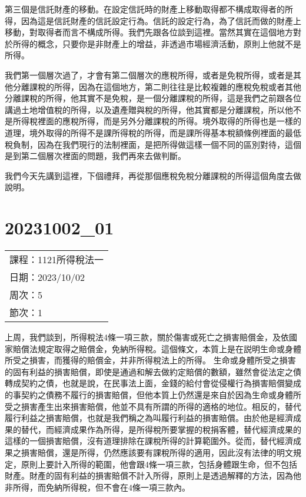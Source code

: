 \documentclass[]{ctexbook}
\begin{document}
第三個是信託財產的移動。在設定信託時的財產上移動取得都不構成取得者的所得，因為這是信託財產的信託設定行為。信託的設定行為，為了信託而做的財產上移動，對取得者而言不構成所得。我們先跟各位談到這裡。當然其實在這個地方對於所得的概念，只要你是非財產上的增益，非透過市場經濟活動，原則上他就不是所得。

我們第一個層次過了，才會有第二個層次的應稅所得，或者是免稅所得，或者是其他分離課稅的所得，因為在這個地方，第二則往往是比較複雜的應稅免稅或者其他分離課稅的所得，他其實不是免稅，是一個分離課稅的所得，這是我們之前跟各位講過土地增值稅的所得，以及遺產贈與稅的所得，他其實都是分離課稅，所以他不是所得稅裡面的應稅所得，而是另外分離課稅的所得。境外取得的所得也是一樣的道理，境外取得的所得不是課所得稅的所得，而是課所得基本稅額條例裡面的最低稅負制，因為在我們現行的法制裡面，是把所得做這樣一個不同的區別對待，這個是到第二個層次裡面的問題，我們再來去做判斷。

我們今天先講到這裡，下個禮拜，再從那個應稅免稅分離課稅的所得這個角度去做說明。

\hypertarget{section-9}{%
\chapter{20231002\_01}\label{section-9}}

\begin{longtable}[]{@{}l@{}}
\toprule()
\endhead
課程：1121所得稅法一 \\
日期：2023/10/02 \\
周次：5 \\
節次：1 \\
\bottomrule()
\end{longtable}

上周，我們談到，所得稅法4條一項三款，關於傷害或死亡之損害賠償金，及依國家賠償法規定取得之賠償金，免納所得稅。這個條文，本質上是在説明生命或身體所受之損害，而獲得的賠償金，并非所得稅法上的所得。
生命或身體所受之損害的固有利益的損害賠償，即使是通過和解去做約定賠償的數額，雖然會從法定之債轉成契約之債，也就是說，在民事法上面，金錢的給付會從侵權行為損害賠償變成的事契約之債務不履行的損害賠償，但他本質上仍然還是來自於因為生命或身體所受之損害產生出來損害賠償，他並不具有所謂的所得的適格的地位。相反的，替代履行利益之損害賠償，也就是我們稱之為叫履行利益的損害賠償。由於他是經濟成果的替代，而經濟成果作為所得，是所得稅所要掌握的稅捐客體，替代經濟成果的這樣的一個損害賠償，沒有道理排除在課稅所得的計算範圍外。從而，替代經濟成果之損害賠償，還是所得，仍然應該要有課稅所得的適用，因此沒有法律的明文規定，原則上要計入所得的範圍，他會跟4條一項三款，包括身體跟生命，但不包括財產。財產的固有利益的損害賠償不計入所得，原則上是透過解釋的方法，因為他非所得，而免納所得稅，但不會在4條一項三款內。
\end{document}
